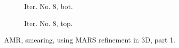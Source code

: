 \documentclass[a4paper,12pt]{amsart}
\numberwithin{equation}{section}
\begin{document}
\begin{figure}[h!]
\begin{subfigure}[t]{0.49\textwidth}
    \caption{Iter. No. 8, bot.}
\end{subfigure}
	\hfill
\begin{subfigure}[t]{0.49\textwidth}
    \caption{Iter. No. 8, top.}
\end{subfigure}

\caption{AMR, smearing, using MARS refinement in 3D, part 1.}
\label{fig:amr_trans3D_pv_mars_topbot_part1}
\end{figure}
\end{document}
